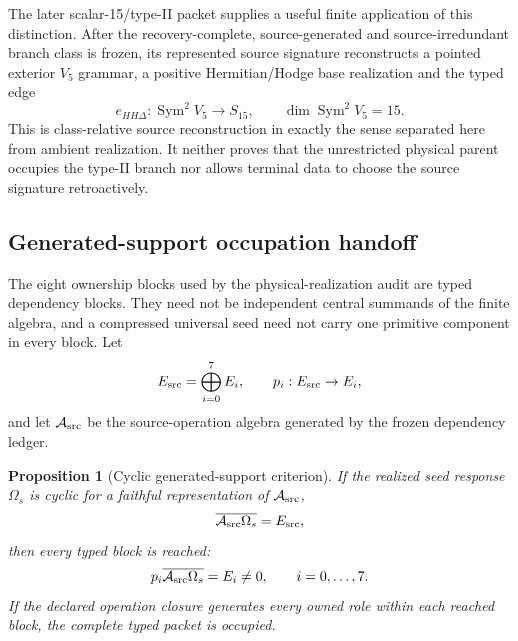 \documentclass[11pt]{article}
\newtheorem{proposition}{Proposition}
\begin{document}
The later scalar-15/type-II packet supplies a useful finite application of
this distinction.  After the recovery-complete, source-generated and
source-irredundant branch class is frozen, its represented source signature
reconstructs a pointed exterior \(V_5\) grammar, a positive Hermitian/Hodge
base realization and the typed edge
\begin{equation}
 e_{HH\Delta}:\operatorname{Sym}^2V_5\longrightarrow S_{15},
 \qquad \dim\operatorname{Sym}^2V_5=15.
 \label{eq:downstream-scalar15-signature}
\end{equation}
This is class-relative source reconstruction in exactly the sense separated
here from ambient realization.  It neither proves that the unrestricted
physical parent occupies the type-II branch nor allows terminal data to
choose the source signature retroactively.

\subsection{Generated-support occupation handoff}

The eight ownership blocks used by the physical-realization audit are typed
dependency blocks. They need not be independent central summands of the finite
algebra, and a compressed universal seed need not carry one primitive
component in every block. Let
\begin{equation}
 E_{\rm src}=\bigoplus_{i=0}^{7}E_i,
 \qquad p_i:E_{\rm src}\to E_i,
\end{equation}
and let \(\mathcal A_{\rm src}\) be the source-operation algebra generated by
the frozen dependency ledger.

\begin{proposition}[Cyclic generated-support criterion]
If the realized seed response \(\Omega_s\) is cyclic for a faithful
representation of \(\mathcal A_{\rm src}\),
\begin{equation}
 \overline{\mathcal A_{\rm src}\Omega_s}=E_{\rm src},
 \label{eq:generated-support-cyclicity}
\end{equation}
then every typed block is reached:
\begin{equation}
 p_i\overline{\mathcal A_{\rm src}\Omega_s}=E_i\ne0,
 \qquad i=0,\ldots,7.
 \label{eq:generated-support-blocks}
\end{equation}
If the declared operation closure generates every owned role within each
reached block, the complete typed packet is occupied.
\end{proposition}
\end{document}
